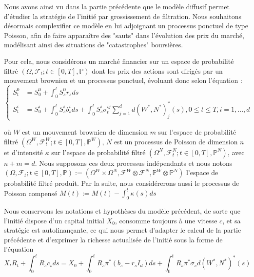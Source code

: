 \documentclass[../finalreport.tex]{subfiles}
\begin{document}
\par Nous avons ainsi vu dans la partie précédente que le modèle diffusif permet d'étudier la stratégie de l'initié par grossissement de filtration. Nous souhaitons désormais complexifier ce modèle en lui adjoignant un processus ponctuel de type Poisson, afin de faire apparaître des "sauts" dans l'évolution des prix du marché, modélisant ainsi des situations de "catastrophes" boursières.

\par Pour cela, nous considérons un marché financier sur un espace de probabilité filtré $(\Omega, \mathcal{F}_t; t \in [0, T], \mathbb{P})$ dont les prix des actions sont dirigés par un mouvement brownien et un processus ponctuel, évoluant donc selon l'équation : 
\begin{equation}
\begin{cases}
S^0_t &= S_0^0 + \displaystyle \int_{0}^{t} S^0_s r_s ds \\
S_t^i &= S_0^i + \displaystyle \int_{0}^{t}S_s^i b_s^i ds + \int_{0}^{t}S_s^i \sigma^{ij}_t \sum_{j = 1}^{d} d(W^*, N^*)^{*}_j(s), 0 \leq t \leq T, i = 1, ..., d
\end{cases}
\end{equation}

où $W$ est un mouvement brownien de dimension $m$ sur l'espace de probabilité filtré $(\Omega^W, \mathcal{F}^W_t; t \in [0, T], \mathbb{P}^W)$, $N$ est un processus de Poisson de dimension $n$ et d'intensité $\kappa$ sur l'espace de probabilité filtré $(\Omega^N, \mathcal{F}^N_t; t \in [0, T], \mathbb{P}^N)$, avec $n + m = d$. Nous supposons ces deux processus indépendants et nous notons $(\Omega, \mathcal{F}_t; t\in [0, T], \mathbb{P}) := (\Omega^W \times \Omega^N, \mathcal{F}^W \otimes \mathcal{F}^N, \mathbb{P}^W \otimes \mathbb{P}^N)$ l'espace de probabilité filtré produit. Par la suite, nous considérerons aussi le processus de Poisson compensé $M \left( t \right) := M \left( t \right) - \int_{0}^{t} \kappa \left( s \right) ds$  \\

\par Nous conservons les notations et hypothèses du modèle précédent, de sorte que l'initié dispose d'un capital initial $X_0$, consomme toujours à une vitesse $c$, et sa stratégie est autofinançante, ce qui nous permet d'adapter le calcul de la partie précédente et d'exprimer la richesse actualisée de l'initié sous la forme de l'équation
\begin{displaymath}
X_t R_t + \int_{0}^{t} R_s c_s ds = X_0 + \int_{0}^{t} R_s\pi^*(b_s - r_s I_d)ds + \int_{0}^{t} R_s\pi^* \sigma_s d(W^*, N^*)^*(s)
\end{displaymath}
\end{document}
